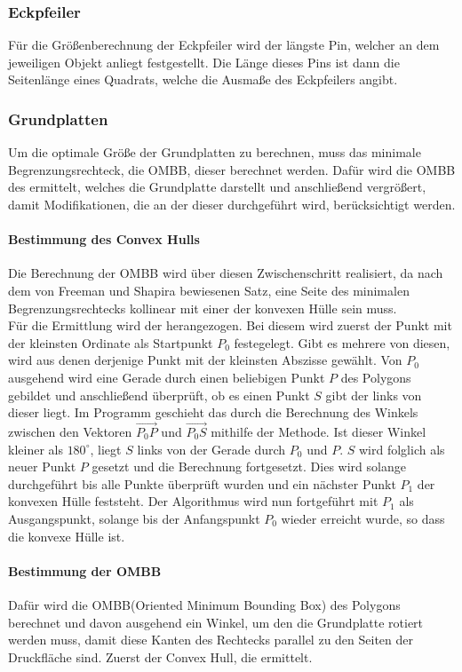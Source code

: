 \subsubsection{Eckpfeiler}
Für die Größenberechnung der Eckpfeiler wird der längste Pin, welcher an dem jeweiligen Objekt anliegt festgestellt.
Die Länge dieses Pins ist dann die Seitenlänge eines Quadrats, welche die Ausmaße des Eckpfeilers angibt.
\subsubsection{Grundplatten}
Um die optimale Größe der Grundplatten zu berechnen, muss das minimale Begrenzungsrechteck, die OMBB, dieser berechnet werden.
Dafür wird die OMBB des  ermittelt, welches die Grundplatte darstellt und anschließend vergrößert, damit Modifikationen, die an der dieser durchgeführt wird, berücksichtigt werden.
\paragraph{Bestimmung des Convex Hulls}
Die Berechnung der OMBB wird über diesen Zwischenschritt realisiert, da nach dem von Freeman und Shapira bewiesenen Satz, eine Seite des minimalen Begrenzungsrechtecks kollinear mit einer der konvexen Hülle sein muss. \\
Für die Ermittlung wird der  herangezogen.
Bei diesem wird zuerst der Punkt mit der kleinsten Ordinate als Startpunkt $P_0$ festegelegt.
Gibt es mehrere von diesen, wird aus denen derjenige Punkt mit der kleinsten Abszisse gewählt.
Von $P_0$ ausgehend wird eine Gerade durch einen beliebigen Punkt $P$ des Polygons gebildet und anschließend überprüft, ob es einen Punkt $S$ gibt der links von dieser liegt.
Im Programm geschieht das durch die Berechnung des Winkels zwischen den Vektoren $\overrightarrow{{P_0}P}$ und $\overrightarrow{{P_0}S}$ mithilfe der  Methode.
Ist dieser Winkel kleiner als $180^\circ$, liegt $S$ links von der Gerade durch $P_0$ und $P$.
$S$ wird folglich als neuer Punkt $P$ gesetzt und die Berechnung fortgesetzt.
Dies wird solange durchgeführt bis alle Punkte überprüft wurden und ein nächster Punkt $P_1$ der konvexen Hülle feststeht.
Der Algorithmus wird nun fortgeführt mit $P_1$ als Ausgangspunkt, solange bis der Anfangspunkt $P_0$ wieder erreicht wurde, so dass die konvexe Hülle  ist.
\paragraph{Bestimmung der OMBB}
Dafür wird die OMBB(Oriented Minimum Bounding Box) des Polygons berechnet und davon ausgehend ein Winkel, um den die Grundplatte rotiert werden muss, damit diese Kanten des Rechtecks parallel zu den Seiten der Druckfläche sind.
Zuerst der Convex Hull, die  ermittelt.